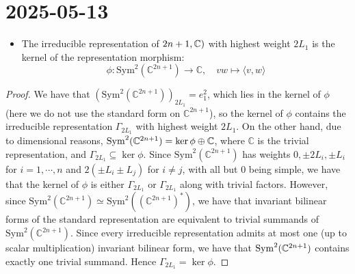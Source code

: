 \documentclass{report}
\begin{document}
\section{2025-05-13}
\begin{itemize}
    \item The irreducible representation of $\so(2n+1, \mathbb C)$ with highest weight $2L_1$ is the kernel of the representation morphism:
    \[
    \phi: \mathrm{Sym}^2(\mathbb C^{2n+1}) \to \mathbb C, \quad vw \mapsto \langle v, w \rangle
    \]
\end{itemize}
\begin{proof}
    We have that $(\mathrm{Sym}^2(\mathbb C^{2n+1}))_{2L_1} = e_1^2$, which lies in the kernel of $\phi$ (here we do not use the standard form on $\mathbb C^{2n+1}$), so the kernel of $\phi$ contains the irreducible representation $\Gamma_{2L_1}$ with highest weight $2L_1$.
    On the other hand, due to dimensional reasons, $\operatorname{Sym}^2(\mathbb C^{2n+1}) = \ker \phi \oplus \mathbb C$, where $\mathbb C$ is the trivial representation, and $\Gamma_{2L_1} \subseteq \ker \phi$.
    Since $\mathrm{Sym}^2(\mathbb C^{2n+1})$ has weights $0, \pm 2L_i, \pm L_i$ for $i = 1, \cdots, n$ and $2(\pm L_i \pm L_j)$ for $i \neq j$, with all but $0$ being simple, we have that the kernel of $\phi$ is either $\Gamma_{2L_1}$ or $\Gamma_{2L_1}$ along with trivial factors. 
    However, since $\mathrm{Sym}^2(\mathbb C^{2n+1}) \simeq \mathrm{Sym}^2((\mathbb C^{2n+1})^*)$, we have that invariant bilinear forms of the standard representation are equivalent to trivial summands of $\mathrm{Sym}^2(\mathbb C^{2n+1})$.
    Since every irreducible representation admits at most one (up to scalar multiplication) invariant bilinear form, we have that $\operatorname{Sym}^2(\mathbb C^{2n+1})$ contains exactly one trivial summand.
    Hence $\Gamma_{2L_1} = \ker \phi$.
\end{proof}
\end{document}
